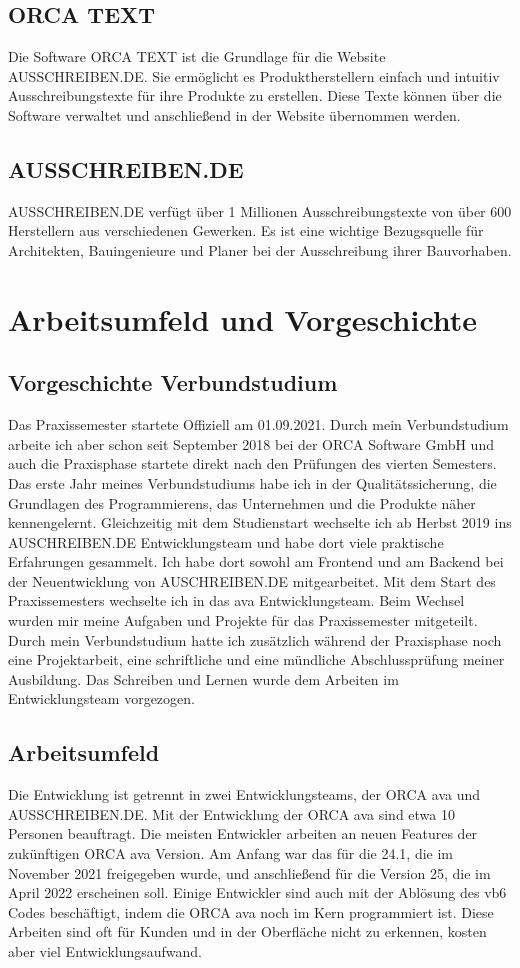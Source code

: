 \section{ORCA TEXT}
Die Software ORCA TEXT ist die Grundlage für die Website AUSSCHREIBEN.DE. Sie ermöglicht es Produktherstellern einfach und intuitiv Ausschreibungstexte für ihre Produkte zu erstellen. Diese Texte können über die Software verwaltet und anschließend in der Website übernommen werden. 

\section{AUSSCHREIBEN.DE}
AUSSCHREIBEN.DE verfügt über 1 Millionen Ausschreibungstexte von über 600 Herstellern aus verschiedenen Gewerken. Es ist eine wichtige Bezugsquelle für Architekten, Bauingenieure und Planer bei der Ausschreibung ihrer Bauvorhaben.

\chapter{Arbeitsumfeld und Vorgeschichte}

\section{Vorgeschichte Verbundstudium}
Das Praxissemester startete Offiziell am 01.09.2021. Durch mein Verbundstudium arbeite ich aber schon seit September 2018 bei der ORCA Software GmbH und auch die Praxisphase startete direkt nach den Prüfungen des vierten Semesters. Das erste Jahr meines Verbundstudiums habe ich in der Qualitätssicherung, die Grundlagen des Programmierens, das Unternehmen und die Produkte näher kennengelernt. Gleichzeitig mit dem Studienstart wechselte ich ab Herbst 2019 ins  AUSCHREIBEN.DE Entwicklungsteam und habe dort viele praktische Erfahrungen gesammelt. Ich habe dort sowohl am Frontend und am Backend bei der Neuentwicklung von AUSCHREIBEN.DE mitgearbeitet. Mit dem Start des Praxissemesters wechselte ich in das \ac{ava} Entwicklungsteam. Beim Wechsel wurden mir meine Aufgaben und Projekte für das Praxissemester mitgeteilt. Durch mein Verbundstudium hatte ich zusätzlich während der Praxisphase noch eine Projektarbeit, eine schriftliche und eine mündliche Abschlussprüfung meiner Ausbildung. Das Schreiben und Lernen wurde dem Arbeiten im Entwicklungsteam vorgezogen.

\section{Arbeitsumfeld}
Die Entwicklung ist getrennt in zwei Entwicklungsteams, der ORCA \ac{ava} und AUSSCHREIBEN.DE. Mit der Entwicklung der ORCA \ac{ava} sind etwa 10 Personen beauftragt. Die meisten Entwickler arbeiten an neuen Features der zukünftigen ORCA \ac{ava} Version. Am Anfang war das für die 24.1, die im November 2021 freigegeben wurde, und anschließend für die Version 25, die im April 2022 erscheinen soll. Einige Entwickler sind auch mit der Ablösung des \ac{vb6} Codes beschäftigt, indem die ORCA \ac{ava} noch im Kern programmiert ist. Diese Arbeiten sind oft für Kunden und in der Oberfläche nicht zu erkennen, kosten aber viel Entwicklungsaufwand.

